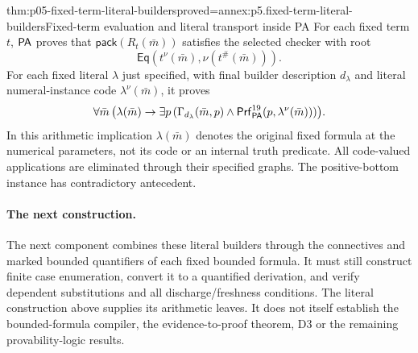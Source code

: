 \begin{hbtheorem}{thm:p05-fixed-term-literal-builders}{proved=annex:p5.fixed-term-literal-builders}{Fixed-term evaluation and literal transport inside PA}
For each fixed term \(t\), \(\mathsf{PA}\) proves that
\(\mathsf{pack}(R_t(\bar m))\) satisfies the selected checker with root
\[
                 \mathsf{Eq}(t^\nu(\bar m),\nu(t^\#(\bar m))).
\]
For each fixed literal \(\lambda\) just specified, with final builder
description \(d_\lambda\) and literal numeral-instance code
\(\lambda^\nu(\bar m)\), it proves
\[
 \forall\bar m\,\bigl(\lambda(\bar m)\to
   \exists p\,(\Gamma_{d_\lambda}(\bar m,p)\land
                \mathsf{Prf}^{19}_{\mathsf{PA}}(p,\lambda^\nu(\bar m)))\bigr).
\]
In this arithmetic implication \(\lambda(\bar m)\) denotes the original
fixed formula at the numerical parameters, not its code or an internal truth
predicate. All code-valued applications are eliminated through their specified
graphs. The positive-bottom instance has contradictory antecedent.
\end{hbtheorem}

\paragraph{The next construction.}
The next component combines these literal builders through the connectives and
marked bounded quantifiers of each fixed bounded formula. It must still
construct finite case enumeration, convert it to a quantified derivation, and
verify dependent substitutions and all discharge/freshness conditions. The
literal construction above supplies its arithmetic leaves. It does not itself
establish the bounded-formula compiler, the evidence-to-proof theorem, D3 or
the remaining provability-logic results.
